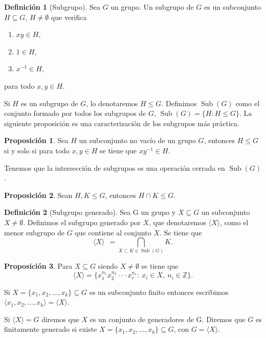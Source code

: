 \documentclass[12pt]{book}
\theoremstyle{definition}
\newtheorem{defi}{Definición}[section]
\newtheorem{prop}{Proposición}[section]
\begin{document}
\begin{defi}[Subgrupo]
Sea $G$ un grupo. Un subgrupo de $G$ es un subconjunto $H\subseteq G$, $H\neq\emptyset$ que verifica
\begin{enumerate}
\item $xy\in H$,
\item $1\in H$,
\item $x^{-1}\in H,$
\end{enumerate}
para todo $x,y\in H.$

Si $H$ es un subgrupo de $G$, lo denotaremos $H\leq G$. Definimos $\operatorname{Sub}(G)$ como el conjunto formado por todos los subgrupos de $G$, $\operatorname{Sub}(G)=\{H:H\leq G\}$. La siguiente proposición es una caracterización de los subgrupos más práctica.

\begin{prop}
Sea $H$ un subconjunto no vacío de un grupo $G$, entonces $H\leq G$ si y solo si para todo $x,y\in H$ se tiene que $xy^{-1}\in H$.
\end{prop}

Tenemos que la intersección de subgrupos es una operación cerrada en $\operatorname{Sub}(G)$.
\begin{prop}
Sean $H,K\leq G$, entonces $H\cap K\leq G.$
\end{prop}



\end{defi}

\begin{defi}[Subgrupo generado]
Sea G un grupo y $X\subseteq G$ un subconjunto $X\neq\emptyset$. Definimos el subgrupo generado por $X$, que denotaremos $\langle X\rangle$, como el menor subgrupo de $G$ que contiene al conjunto $X$. Se tiene que
$$\langle X\rangle\ \ =\bigcap_{X\subset K\in \operatorname{Sub}(G)}K.$$

\end{defi}

\begin{prop}
Para $X\subseteq G$ siendo $X\neq\emptyset$ se tiene que
$$\langle X\rangle = \{x_1^{n_1}x_2^{n_2}\cdot\cdot\cdot x_r^{n_r} :\ x_i\in X,\ n_i\in\mathbb{Z}\}.$$

\end{prop}



Si $X=\{x_1,x_2,...,x_k\}\subseteq G$ es un subconjunto finito entonces escribimos $\langle x_1,x_2,...,x_k\rangle=\langle X\rangle$.

Si $\langle X\rangle = G$ diremos que $X$ es un conjunto de generadores de G. Diremos que $G$ es finitamente generado si existe $X=\{x_1,x_2,...,x_k\}\subseteq G$, con $G=\langle X\rangle$. 
\newline
\end{document}
